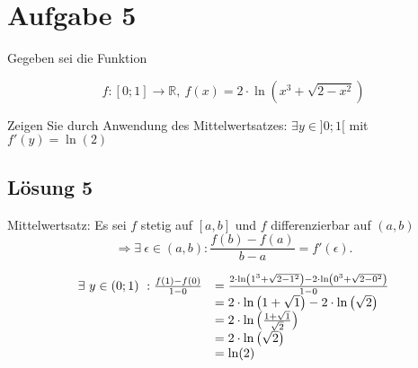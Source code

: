 \documentclass[main.tex]{subfiles}
\begin{document}
\section{Aufgabe 5}
Gegeben sei die Funktion

\begin{equation*}
    f:[0;1]\rightarrow \mathbb{R} ,\ f( x) =2\cdotp \ln\left( x^{3} +\sqrt{2-x^{2}}\right)
\end{equation*}

Zeigen Sie durch Anwendung des Mittelwertsatzes: $\exists y\in ] 0;1[$ mit $f'( y) =\ln( 2)$

\subsection{Lösung 5}

Mittelwertsatz:
Es sei $f$ stetig auf $[a,b]$ und $f$ differenzierbar auf $(a,b)$
\begin{equation*}
    \Rightarrow \exists \ \epsilon \in (a,b) : \frac{f(b)-f(a)}{b-a} = f'(\epsilon) \text{.}
\end{equation*}

\begin{equation*}
    \begin{array}{ r l }
    \exists \ y\in (0;1) \ :\frac{f( 1) -f( 0)}{1-0} & =\frac{2\cdotp \ln\left( 1^{3} +\sqrt{2-1^{2}}\right) -2\cdotp \ln\left( 0^{3} +\sqrt{2-0^{2}}\right)}{1-0}\\
     & =2\cdotp \ln\left( 1+\sqrt{1}\right) -2\cdotp \ln\left(\sqrt{2}\right)\\
     & =2\cdotp \ln\left(\frac{1+\sqrt{1}}{\sqrt{2}}\right)\\
     & =2\cdotp \ln\left(\sqrt{2}\right)\\
     & =\ln( 2)
    \end{array}
\end{equation*}
\end{document}
